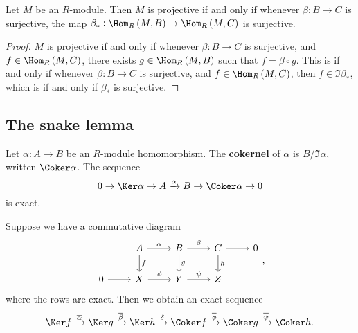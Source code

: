 \begin{proposition}
Let $ M $ be an $ R $-module. Then $ M $ is projective if and only if whenever $ \beta : B \to C $ is surjective, the map $ \beta_* : \Hom_R\br{M, B} \to \Hom_R\br{M, C} $ is surjective.
\end{proposition}

\begin{proof}
$ M $ is projective if and only if whenever $ \beta : B \to C $ is surjective, and $ f \in \Hom_R\br{M, C} $, there exists $ g \in \Hom_R\br{M, B} $ such that $ f = \beta \circ g $. This is if and only if whenever $ \beta : B \to C $ is surjective, and $ f \in \Hom_R\br{M, C} $, then $ f \in \Im \beta_* $, which is if and only if $ \beta_* $ is surjective.
\end{proof}

\subsection{The snake lemma}


Let $ \alpha : A \to B $ be an $ R $-module homomorphism. The \textbf{cokernel} of $ \alpha $ is $ B / \Im \alpha $, written $ \Coker \alpha $. The sequence
$$ 0 \to \Ker \alpha \to A \xrightarrow{\alpha} B \to \Coker \alpha \to 0 $$
is exact.

\begin{lemma}
Suppose we have a commutative diagram
$$
\begin{tikzcd}
& A \arrow{r}{\alpha} \arrow{d}{f} & B \arrow{r}{\beta} \arrow{d}{g} & C \arrow{r} \arrow{d}{h} & 0 \\
0 \arrow{r} & X \arrow{r}{\phi} & Y \arrow{r}{\psi} & Z &
\end{tikzcd},
$$
where the rows are exact. Then we obtain an exact sequence
$$ \Ker f \xrightarrow{\overline{\alpha}} \Ker g \xrightarrow{\overline{\beta}} \Ker h \xrightarrow{\delta} \Coker f \xrightarrow{\overline{\phi}} \Coker g \xrightarrow{\overline{\psi}} \Coker h. $$
\end{lemma}

\pagebreak

